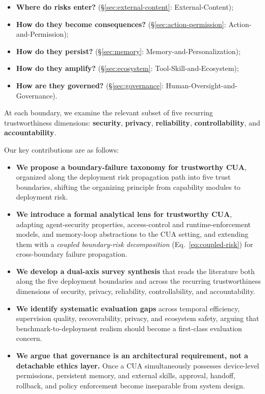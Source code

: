 \begin{itemize}[leftmargin=1.5em]
  \item \textbf{Where do risks enter?} (\S\ref{sec:external-content}: External-Content);
  \item \textbf{How do they become consequences?} (\S\ref{sec:action-permission}: Action-and-Permission);
  \item \textbf{How do they persist?} (\S\ref{sec:memory}: Memory-and-Personalization);
  \item \textbf{How do they amplify?} (\S\ref{sec:ecosystem}: Tool-Skill-and-Ecosystem);
  \item \textbf{How are they governed?} (\S\ref{sec:governance}: Human-Oversight-and-Governance).
\end{itemize}

\noindent At each boundary, we examine the relevant subset of five recurring trustworthiness dimensions: \textbf{security}, \textbf{privacy}, \textbf{reliability}, \textbf{controllability}, and \textbf{accountability}.

Our key contributions are as follows:

\begin{itemize}[leftmargin=1.5em]
  \item \textbf{We propose a boundary-failure taxonomy for trustworthy CUA}, organized along the deployment risk propagation path into five trust boundaries, shifting the organizing principle from capability modules to deployment risk.

  \item \textbf{We introduce a formal analytical lens for trustworthy CUA}, adapting agent-security properties, access-control and runtime-enforcement models, and memory-loop abstractions to the CUA setting, and extending them with a \emph{coupled boundary-risk decomposition} (Eq.~\ref{eq:coupled-risk}) for cross-boundary failure propagation.

  \item \textbf{We develop a dual-axis survey synthesis} that reads the literature both along the five deployment boundaries and across the recurring trustworthiness dimensions of security, privacy, reliability, controllability, and accountability.

  \item \textbf{We identify systematic evaluation gaps} across temporal efficiency, supervision quality, recoverability, privacy, and ecosystem safety, arguing that benchmark-to-deployment realism should become a first-class evaluation concern.

  \item \textbf{We argue that governance is an architectural requirement, not a detachable ethics layer.} Once a CUA simultaneously possesses device-level permissions, persistent memory, and external skills, approval, handoff, rollback, and policy enforcement become inseparable from system design.
\end{itemize}

